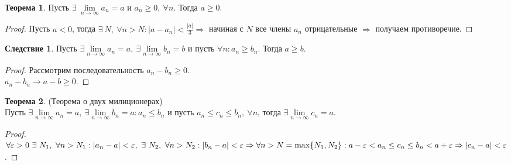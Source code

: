 \documentclass[a4paper, 12pt]{article}
\renewcommand{\epsilon}{\varepsilon}
\newcommand{\lims}{\lim\limits_{n\to \infty}}
\theoremstyle{definition}
\newtheorem*{theorem}{Теорема}
\newtheorem*{consequense}{Следствие}
\newtheorem*{comm}{Замечание}
\begin{document}
        \begin{theorem}
            Пусть $\exists\ \lim\limits_{n\to \infty} a_n=a$ и $a_n\geq 0,\ \forall n$. Тогда $a\geq 0$.
        \end{theorem} 
        \begin{proof}
            Пусть $a<0$, тогда $\exists\ N,\ \forall n>N: |a-a_n|<\frac{|a|}{3} \Rightarrow$ начиная с $N$ все члены $a_n$ отрицательные $\Rightarrow$ получаем противоречие.
        \end{proof} 
        \begin{consequense}
            Пусть $\exists \lims a_n =a,\ \exists \lims b_n=b$ и пусть $\forall n: a_n\geq b_n$. Тогда $a\geq b$.
        \end{consequense}  
        \begin{proof}
            Рассмотрим последовательность $a_n-b_n\geq 0$.\\ $a_n-b_n\to a-b\geq 0$.
        \end{proof} 
        \begin{theorem} (Теорема о двух милиционерах)\\
            Пусть $\exists \lims a_n =a,\ \exists \lims b_n=a: a_n\leq b_n$ и пусть $a_n\leq c_n\leq b_n,\ \forall n$, тогда $\exists \lims c_n=a$.
        \end{theorem} 
        \begin{proof}
            $\forall \epsilon>0\ \exists\ N_1,\ \forall n>N_1: |a_n-a|<\epsilon,\ \exists\ N_2,\ \forall n>N_2:\\
            |b_n-a|<\epsilon \Rightarrow \forall n > N=\max\{N_1,N_2\}: a-\epsilon < a_n\leq c_n \leq b_n < a+\epsilon\\
            \Rightarrow |c_n-a|<\epsilon$.
        \end{proof}
\end{document}
